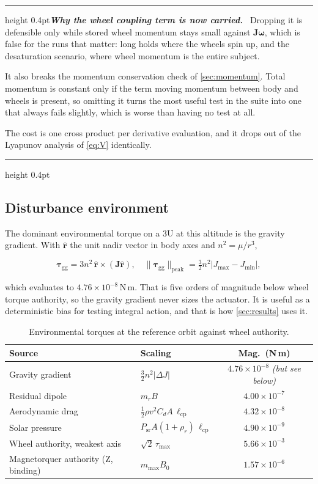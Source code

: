 \documentclass[conference,10pt,a4paper]{IEEEtran}
\newcommand{\remarkrule}{\par\nobreak\vspace{2pt}%
  \hrule height 0.4pt\vspace{4pt}\nobreak}
\newenvironment{designbox}[1][Design decision]
  {\par\medskip\remarkrule\noindent\small\textbf{\textit{#1.}}\ \ignorespaces}
  {\par\vspace{3pt}\hrule height 0.4pt\par\medskip\ignorespacesafterend}
\newcommand{\NOTE}[1]{{\small\textit{(#1)}}}
\newcommand{\NOTE}[1]{}
\newcommand{\vect}[1]{\bm{#1}}
\newcommand{\mat}[1]{\bm{#1}}
\newcommand{\unit}[1]{\ensuremath{\,\mathrm{#1}}}
\begin{document}
\begin{designbox}[Why the wheel coupling term is now carried]
Dropping it is defensible only while stored wheel momentum stays small against
$\mat{J}\vect{\omega}$, which is false for the runs that matter: long holds
where the wheels spin up, and the desaturation scenario, where wheel momentum
is the entire subject.

It also breaks the momentum conservation check of \cref{sec:momentum}. Total
momentum is constant only if the term moving momentum between body and wheels
is present, so omitting it turns the most useful test in the suite into one
that always fails slightly, which is worse than having no test at all.

The cost is one cross product per derivative evaluation, and it drops out of
the Lyapunov analysis of \cref{eq:V} identically.
\end{designbox}

\subsection{Disturbance environment}
\label{sec:disturbance}

The dominant environmental torque on a 3U at this altitude is the gravity
gradient. With $\hat{\vect{r}}$ the unit nadir vector in body axes and
$n^2=\mu/r^3$,

\begin{equation}
\vect{\tau}_\text{gg} = 3n^2\,\hat{\vect{r}}\times\!\left(\mat{J}\hat{\vect{r}}\right),
\quad
\|\vect{\tau}_\text{gg}\|_\text{peak}
= \tfrac{3}{2}n^2\left|J_\text{max}-J_\text{min}\right|,
\label{eq:gg}
\end{equation}

which evaluates to $4.76\times10^{-8}\unit{N\,m}$. That is five orders of
magnitude below wheel torque authority, so the gravity gradient never sizes the
actuator. It is useful as a deterministic bias for testing integral action, and
that is how \cref{sec:results} uses it.

\begin{table}[!t]
\centering
\caption{Environmental torques at the reference orbit against wheel authority.}
\label{tab:disturbances}
\footnotesize
\begin{tabular}{@{}llc@{}}
\toprule
\textbf{Source} & \textbf{Scaling} & \textbf{Mag.\ (N\,m)} \\
\midrule
Gravity gradient & $\tfrac{3}{2}n^2|\Delta J|$ & $4.76\times10^{-8}$ \NOTE{but see below} \\
Residual dipole  & $m_r B$                     & $4.00\times10^{-7}$ \\
Aerodynamic drag & $\tfrac{1}{2}\rho v^2 C_d A\,\ell_\text{cp}$ & $4.32\times10^{-8}$ \\
Solar pressure   & $P_\text{sr}A(1{+}\rho_r)\,\ell_\text{cp}$   & $4.90\times10^{-9}$ \\
\midrule
Wheel authority, weakest axis & $\sqrt2\,\tau_\text{max}$ & $5.66\times10^{-3}$ \\
Magnetorquer authority (Z, binding) & $m_\text{max}B_0$ & $1.57\times10^{-6}$ \\
\bottomrule
\end{tabular}
\end{table}
\end{document}
